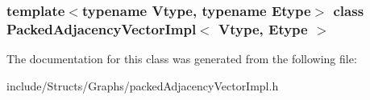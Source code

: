 \subsubsection*{template$<$typename Vtype, typename Etype$>$ class PackedAdjacencyVectorImpl$<$ Vtype, Etype $>$}



The documentation for this class was generated from the following file:\begin{DoxyCompactItemize}
\item 
include/Structs/Graphs/packedAdjacencyVectorImpl.h\end{DoxyCompactItemize}
